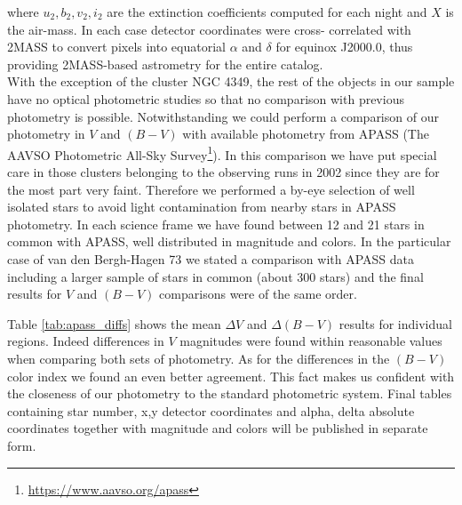\documentclass{aa}
\begin{document}
where $u_2, b_2, v_2, i_2$ are the extinction coefficients computed for each
night and $X$ is the air-mass. In each case detector coordinates were cross-
correlated with 2MASS \citep{2006AJ....131.1163S} to convert pixels into
equatorial $\alpha$ and $\delta$ for equinox J2000.0, thus providing 2MASS-based
astrometry for the entire catalog.\\

With the exception of the cluster NGC 4349, the rest of the objects in our
sample have no optical photometric studies so that no comparison with previous
photometry is possible. Notwithstanding we could perform a comparison of our
photometry in $V$ and $(B-V)$ with available photometry from APASS (The AAVSO
Photometric All-Sky Survey\footnote{\url{https://www.aavso.org/apass}}).
In this comparison we have put special care in
those clusters belonging to the observing runs in 2002 since they are for the
most part very faint. Therefore we performed a by-eye selection of well isolated
stars to avoid light contamination from nearby stars in APASS photometry. In
each science frame we have found between 12 and 21 stars in common with APASS,
well distributed in magnitude and colors. In the particular case of van den
Bergh-Hagen 73 we stated a comparison with APASS data including a larger sample
of stars in common (about 300 stars) and the final results for $V$ and $(B-V)$
comparisons were of the same order.

Table \ref{tab:apass_diffs} shows the mean $\Delta V$ and $\Delta(B-V)$ results
for individual regions. Indeed differences in $V$ magnitudes were found within
reasonable values when comparing both sets of photometry. As for the differences
in the $(B-V)$ color index we found an even better agreement. This fact makes us
confident with the closeness of our photometry to the standard photometric
system. Final tables containing star number, x,y detector coordinates and alpha,
delta absolute coordinates together with magnitude and colors will be published
in separate form.
\end{document}
